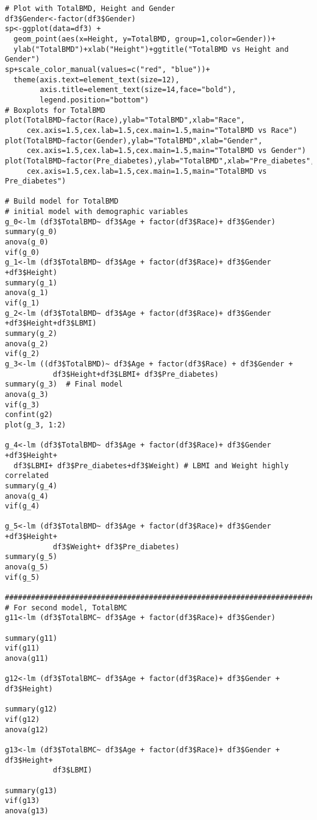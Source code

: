 \documentclass[11pt]{article}
\begin{document}
\begin{verbatim}
# Plot with TotalBMD, Height and Gender
df3$Gender<-factor(df3$Gender)   
sp<-ggplot(data=df3) +
  geom_point(aes(x=Height, y=TotalBMD, group=1,color=Gender))+
  ylab("TotalBMD")+xlab("Height")+ggtitle("TotalBMD vs Height and Gender")
sp+scale_color_manual(values=c("red", "blue"))+
  theme(axis.text=element_text(size=12),
        axis.title=element_text(size=14,face="bold"), 
        legend.position="bottom") 
# Boxplots for TotalBMD
plot(TotalBMD~factor(Race),ylab="TotalBMD",xlab="Race",
     cex.axis=1.5,cex.lab=1.5,cex.main=1.5,main="TotalBMD vs Race")
plot(TotalBMD~factor(Gender),ylab="TotalBMD",xlab="Gender",
     cex.axis=1.5,cex.lab=1.5,cex.main=1.5,main="TotalBMD vs Gender")
plot(TotalBMD~factor(Pre_diabetes),ylab="TotalBMD",xlab="Pre_diabetes",
     cex.axis=1.5,cex.lab=1.5,cex.main=1.5,main="TotalBMD vs Pre_diabetes")

# Build model for TotalBMD
# initial model with demographic variables
g_0<-lm (df3$TotalBMD~ df3$Age + factor(df3$Race)+ df3$Gender)
summary(g_0)
anova(g_0)
vif(g_0)
g_1<-lm (df3$TotalBMD~ df3$Age + factor(df3$Race)+ df3$Gender +df3$Height)
summary(g_1)
anova(g_1)
vif(g_1)
g_2<-lm (df3$TotalBMD~ df3$Age + factor(df3$Race)+ df3$Gender +df3$Height+df3$LBMI)
summary(g_2)
anova(g_2)
vif(g_2)
g_3<-lm ((df3$TotalBMD)~ df3$Age + factor(df3$Race) + df3$Gender +
           df3$Height+df3$LBMI+ df3$Pre_diabetes)
summary(g_3)  # Final model
anova(g_3)
vif(g_3) 
confint(g2)
plot(g_3, 1:2)

g_4<-lm (df3$TotalBMD~ df3$Age + factor(df3$Race)+ df3$Gender +df3$Height+
  df3$LBMI+ df3$Pre_diabetes+df3$Weight) # LBMI and Weight highly correlated
summary(g_4)
anova(g_4)
vif(g_4) 

g_5<-lm (df3$TotalBMD~ df3$Age + factor(df3$Race)+ df3$Gender +df3$Height+
           df3$Weight+ df3$Pre_diabetes)
summary(g_5)
anova(g_5)
vif(g_5) 

############################################################################
# For second model, TotalBMC
g11<-lm (df3$TotalBMC~ df3$Age + factor(df3$Race)+ df3$Gender) 

summary(g11)
vif(g11) 
anova(g11)

g12<-lm (df3$TotalBMC~ df3$Age + factor(df3$Race)+ df3$Gender + df3$Height)

summary(g12)
vif(g12) 
anova(g12)

g13<-lm (df3$TotalBMC~ df3$Age + factor(df3$Race)+ df3$Gender + df3$Height+
           df3$LBMI) 

summary(g13)
vif(g13) 
anova(g13)


\end{verbatim}
\end{document}
